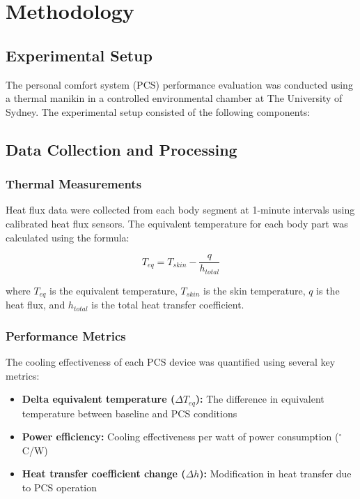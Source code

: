 \section{Methodology}\label{sec:methodology}

\subsection{Experimental Setup}
The personal comfort system (PCS) performance evaluation was conducted using a thermal manikin in a controlled environmental chamber at The University of Sydney. 
The experimental setup consisted of the following components:

\subsection{Data Collection and Processing}

\subsubsection{Thermal Measurements}
Heat flux data were collected from each body segment at 1-minute intervals using calibrated heat flux sensors. The equivalent temperature for each body part was calculated using the formula:

\begin{equation}
T_{eq} = T_{skin} - \frac{q}{h_{total}}
\label{eq:equivalent_temp}
\end{equation}

where $T_{eq}$ is the equivalent temperature, $T_{skin}$ is the skin temperature, $q$ is the heat flux, and $h_{total}$ is the total heat transfer coefficient.

\subsubsection{Performance Metrics}
The cooling effectiveness of each PCS device was quantified using several key metrics:

\begin{itemize}
    \item \textbf{Delta equivalent temperature ($\Delta T_{eq}$):} The difference in equivalent temperature between baseline and PCS conditions
    \item \textbf{Power efficiency:} Cooling effectiveness per watt of power consumption ($^\circ$C/W)
    \item \textbf{Heat transfer coefficient change ($\Delta h$):} Modification in heat transfer due to PCS operation
\end{itemize}

